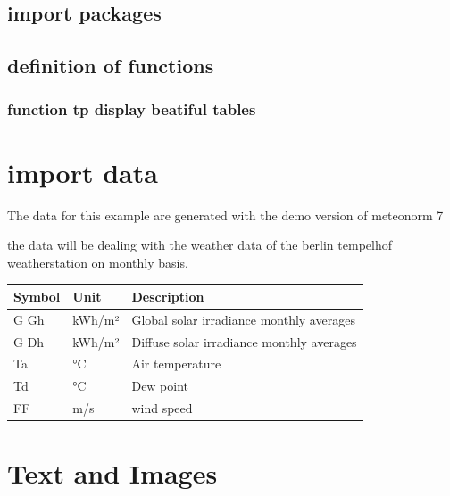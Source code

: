 \documentclass[reprint, floatfix, groupaddress, prb]{article}
\newcommand{\prompt}[4]{
        \ttfamily\llap{{\color{#2}[#3]:\hspace{3pt}#4}}\vspace{-\baselineskip}
    }
\begin{document}
    \hypertarget{import-packages}{%
\subsection{import packages}\label{import-packages}}

    \hypertarget{definition-of-functions}{%
\subsection{definition of functions}\label{definition-of-functions}}

    \hypertarget{function-tp-display-beatiful-tables}{%
\subsubsection{function tp display beatiful
tables}\label{function-tp-display-beatiful-tables}}

    \hypertarget{import-data}{%
\section{import data}\label{import-data}}

    The data for this example are generated with the demo version of
meteonorm 7

the data will be dealing with the weather data of the berlin tempelhof
weatherstation on monthly basis.
 
            
\prompt{Out}{outcolor}{4}{}
    
    \begin{table}[ht] 
\begin{tabular}[l]{lll}
\toprule
Symbol & Unit & Description\\ 
\midrule
G Gh & kWh/m² & Global solar irradiance monthly averages\\ 
G Dh & kWh/m² & Diffuse solar irradiance monthly averages\\ 
Ta & °C & Air temperature\\ 
Td & °C & Dew point\\ 
FF & m/s & wind speed\\ 
\bottomrule 
 \end{tabular}
\end{table}

    

    \hypertarget{text-and-images}{%
\section{Text and Images}\label{text-and-images}}
\end{document}
